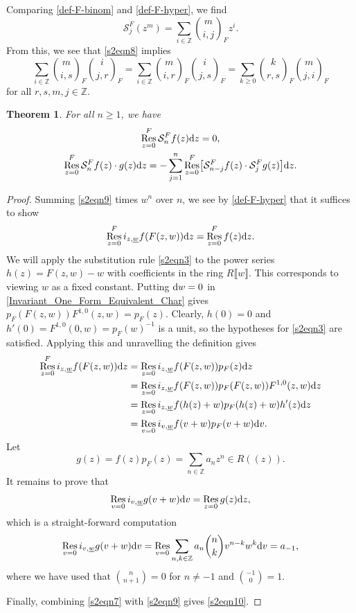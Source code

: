 \documentclass[10pt,a4paper]{amsart}
\numberwithin{equation}{section}
\newtheorem{Theorem}{Theorem}[section]
\theoremstyle{definition}
\DeclareMathOperator\Res{Res}
\newcommand\Fbinom[2]{\binom{#1}{#2}_{\!\!F}}
\def\lb{\llbracket}
\def\rb{\rrbracket}
\begin{document}
Comparing \eqref{def-F-binom} and \eqref{def-F-hyper}, we find
\[
 \mathcal{S}_j^F(z^m)=\sum_{i\in\mathbb{Z}}\Fbinom{m}{i,j}z^i.
\]
From this, we see that \eqref{s2eqn8} implies
\[
 \sum_{i\in\mathbb{Z}}\Fbinom{m}{i,s}\Fbinom{i}{j,r}=\sum_{i\in\mathbb{Z}}\Fbinom{m}{i,r}\Fbinom{i}{j,s}=\sum_{k\geqslant0}\Fbinom{k}{r,s}\Fbinom{m}{j,i}
\]
for all $r,s,m,j\in\mathbb{Z}$.

\begin{Theorem}
\label{s2thm1}
For all $n\geqslant1$, we have
\begin{gather}
 \Res^F_{z=0}\mathcal{S}_n^Ff(z){\rm d}z=0,\label{s2eqn9}\\
 \Res^F_{z=0}\mathcal{S}_n^F f(z)\cdot g(z){\rm d}z=-\sum_{j=1}^n \Res_{z=0}^F\bigl[\mathcal{S}_{n-j}^Ff(z)\cdot \mathcal{S}_j^F g(z)\bigr]{\rm d}z.\label{s2eqn10}
\end{gather}
\end{Theorem}

\begin{proof}
 Summing \eqref{s2eqn9} times $w^n$ over $n$, we see by \eqref{def-F-hyper} that it suffices to show
 \[
 \Res^F_{z=0} i_{z,\underline{w}} f(F(z,w)){\rm d}z=\Res^F_{z=0}f(z){\rm d}z.
 \]
 We will apply the substitution rule \eqref{s2eqn3} to the power series $h(z)=F(z,w)-w$ with coefficients in the ring $R\lb w\rb$. This corresponds to viewing $w$ as a fixed constant. Putting ${\rm d}w=0$ in \eqref{Invariant_One_Form_Equivalent_Char} gives $p_F(F(z,w))F^{1,0}(z,w)=p_F(z)$. Clearly, $h(0)=0$ and $h'(0)=F^{1,0}(0,w)=p_F(w)^{-1}$ is a unit, so the hypotheses for \eqref{s2eqn3} are satisfied. Applying this and unravelling the definition gives
 \begin{align*}
 \Res^F_{z=0} i_{z,\underline{w}} f(F(z,w)){\rm d}z&=\Res_{z=0} i_{z,\underline{w}} f(F(z,w))p_F(z){\rm d}z\\
 &=\Res_{z=0} i_{z,\underline{w}} f(F(z,w))p_F(F(z,w))F^{1,0}(z,w){\rm d}z\\
 &=\Res_{z=0} i_{z,\underline{w}} f(h(z)+w)p_F(h(z)+w)h'(z){\rm d}z\\
 &=\Res_{v=0} i_{v,\underline{w}} f(v+w)p_F(v+w){\rm d}v.
 \end{align*}
 Let \[
 g(z)=f(z)p_F(z)=\sum_{n\in\mathbb{Z}}a_nz^n\in R(\!( z)\!).\]
 It remains to prove that
 \[
 \Res_{v=0} i_{v,\underline{w}}g(v+w){\rm d}v=\Res_{z=0}g(z){\rm d}z,
 \]
 which is a straight-forward computation
 \[
 \Res_{v=0} i_{v,\underline{w}}g(v+w){\rm d}v=\Res_{v=0} \sum_{n,k\in\mathbb{Z}}a_n\binom{n}{k}v^{n-k}w^k {\rm d}v=a_{-1},
 \]
 where we have used that $\binom{n}{n+1}=0$ for $n\neq-1$ and $\binom{-1}{0}=1$.

 Finally, combining \eqref{s2eqn7} with \eqref{s2eqn9} gives \eqref{s2eqn10}.
\end{proof}
\end{document}
